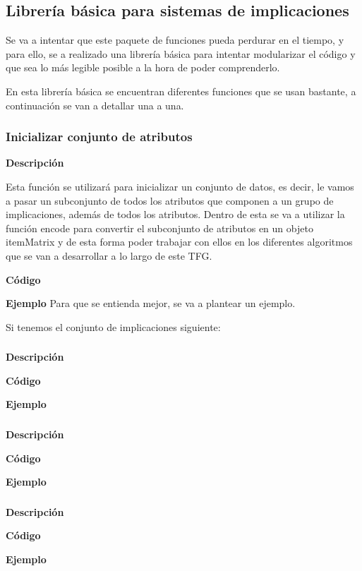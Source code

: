 \subsection{Librer\'ia b\'asica para sistemas de implicaciones}
Se va a intentar que este paquete de funciones pueda perdurar en el tiempo, y para ello, 
se a realizado una librer\'ia b\'asica para intentar modularizar el c\'odigo y que sea lo 
m\'as legible posible a la hora de poder comprenderlo.

En esta librer\'ia b\'asica se encuentran diferentes funciones que se usan bastante, a continuaci\'on 
se van a detallar una a una.




\subsubsection{Inicializar conjunto de atributos}

    \textbf{Descripci\'on}

    Esta funci\'on se utilizar\'a para inicializar un conjunto de datos, es decir, le vamos a pasar un subconjunto 
    de todos los atributos que componen a un grupo de implicaciones, adem\'as de todos los atributos. Dentro de esta 
    se va a utilizar la funci\'on encode para convertir el subconjunto de atributos en un objeto itemMatrix y de esta 
    forma poder trabajar con ellos en los diferentes algoritmos que se van a desarrollar a lo largo de este TFG.


    \textbf{C\'odigo}



    \textbf{Ejemplo}
    Para que se entienda mejor, se va a plantear un ejemplo. 

    Si tenemos el conjunto de implicaciones siguiente: 









\subsubsection{}

    \textbf{Descripci\'on}
    

    \textbf{C\'odigo}

    
    \textbf{Ejemplo}




\subsubsection{}

    \textbf{Descripci\'on}
    

    \textbf{C\'odigo}

    
    \textbf{Ejemplo}



\subsubsection{}

    \textbf{Descripci\'on}
    

    \textbf{C\'odigo}

    
    \textbf{Ejemplo}